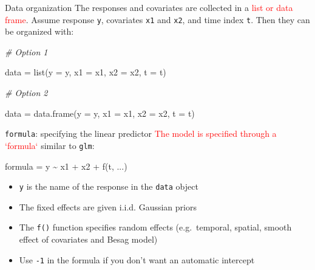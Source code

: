 \documentclass[
  handout]{beamer}
\newenvironment{Shaded}{\begin{snugshade}}{\end{snugshade}}
\newcommand{\AttributeTok}[1]{\textcolor[rgb]{0.77,0.63,0.00}{#1}}
\newcommand{\CommentTok}[1]{\textcolor[rgb]{0.56,0.35,0.01}{\textit{#1}}}
\newcommand{\FunctionTok}[1]{\textcolor[rgb]{0.00,0.00,0.00}{#1}}
\newcommand{\NormalTok}[1]{#1}
\newcommand{\OtherTok}[1]{\textcolor[rgb]{0.56,0.35,0.01}{#1}}
\newcommand{\SpecialCharTok}[1]{\textcolor[rgb]{0.00,0.00,0.00}{#1}}
\begin{document}
\begin{frame}[fragile]{Data organization}
\protect\hypertarget{data-organization}{}
The responses and covariates are collected in a
\textcolor{red}{list or data frame}. Assume response \texttt{y},
covariates \texttt{x1} and \texttt{x2}, and time index \texttt{t}. Then
they can be organized with:

\begin{Shaded}
\begin{Highlighting}[]
\CommentTok{\# Option 1}

\NormalTok{data }\OtherTok{=} \FunctionTok{list}\NormalTok{(}\AttributeTok{y =}\NormalTok{ y, }\AttributeTok{x1 =}\NormalTok{ x1, }\AttributeTok{x2 =}\NormalTok{ x2, }\AttributeTok{t =}\NormalTok{ t)}

\CommentTok{\# Option 2}

\NormalTok{data }\OtherTok{=} \FunctionTok{data.frame}\NormalTok{(}\AttributeTok{y =}\NormalTok{ y, }\AttributeTok{x1 =}\NormalTok{ x1, }\AttributeTok{x2 =}\NormalTok{ x2, }\AttributeTok{t =}\NormalTok{ t)}
\end{Highlighting}
\end{Shaded}
\end{frame}

\begin{frame}[fragile]{\texttt{formula}: specifying the linear
predictor}
\protect\hypertarget{formula-specifying-the-linear-predictor}{}
\textcolor{red}{The model is specified through a `formula`} similar to
\texttt{glm}:

\begin{Shaded}
\begin{Highlighting}[]
\NormalTok{formula }\OtherTok{=}\NormalTok{ y }\SpecialCharTok{\textasciitilde{}}\NormalTok{ x1 }\SpecialCharTok{+}\NormalTok{ x2 }\SpecialCharTok{+} \FunctionTok{f}\NormalTok{(t, ...)}
\end{Highlighting}
\end{Shaded}

\begin{itemize}
\item
  \texttt{y} is the name of the response in the \texttt{data} object
\item
  The fixed effects are given i.i.d. Gaussian priors
\item
  The \texttt{f()} function specifies random effects (e.g.~temporal,
  spatial, smooth effect of covariates and Besag model)
\item
  Use \texttt{-1} in the formula if you don't want an automatic
  intercept
\end{itemize}
\end{frame}
\end{document}
